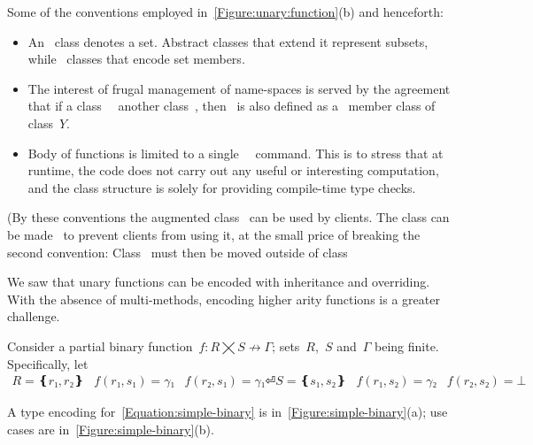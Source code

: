 Some of the conventions employed in~\cref{Figure:unary:function}(b) and henceforth:
\begin{itemize}
  \item An~ class denotes a set. Abstract classes that extend it represent
      subsets, while~ classes that encode set members.
  \item The interest of frugal management of name-spaces is served by the agreement that if
    a class~~ another class~, then~ is also defined
    as a~ member class of class~$Y$.
  \item Body of functions is limited to a single~~\cc{;} command.
      This is to stress that at runtime, the code does not carry out any useful or interesting computation,
      and the class structure is solely for providing compile-time type checks.
\end{itemize}
(By these conventions the augmented class~ can be used by clients.
The class can be made~ to prevent clients from using it,
  at the small price of breaking the second convention:
  Class~ must then be moved outside of class~

We saw that unary functions can be encoded with inheritance and overriding.
With the absence of multi-methods, encoding higher arity functions is a greater challenge.

Consider a partial binary function~$f: R⨉S↛Γ$; sets~$R$,~$S$ and~$Γ$ being finite.
Specifically, let
\begin{equation}
  \label{Equation:simple-binary}
  \begin{array}{ccc}
    R=❴r₁,r₂❵ & f(r₁,s₁)=γ₁ & f(r₂,s₁)=γ₁⏎
    S=❴s₁,s₂❵ & f(r₁,s₂)=γ₂ & f(r₂, s₂)=⊥
  \end{array}
\end{equation}

A \Java type encoding for~\cref{Equation:simple-binary}
  is in~\cref{Figure:simple-binary}(a); use cases
    are in~\cref{Figure:simple-binary}(b).


